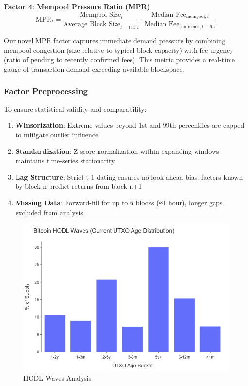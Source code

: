 \documentclass[
  12pt,
  letterpaper,
  DIV=11,
  numbers=noendperiod]{scrartcl}
\providecommand{\tightlist}{%
  \setlength{\itemsep}{0pt}\setlength{\parskip}{0pt}}
\begin{document}
\textbf{Factor 4: Mempool Pressure Ratio (MPR)}
\[\text{MPR}_{t} = \frac{\text{Mempool Size}_t}{\text{Average Block Size}_{t-144:t}} \cdot \frac{\text{Median Fee}_{\text{mempool},t}}{\text{Median Fee}_{\text{confirmed},t-6:t}}\]

Our novel MPR factor captures immediate demand pressure by combining
mempool congestion (size relative to typical block capacity) with fee
urgency (ratio of pending to recently confirmed fees). This metric
provides a real-time gauge of transaction demand exceeding available
blockspace.

\subsubsection{Factor Preprocessing}\label{factor-preprocessing}

To ensure statistical validity and comparability:

\begin{enumerate}
\def\labelenumi{\arabic{enumi}.}
\tightlist
\item
  \textbf{Winsorization}: Extreme values beyond 1st and 99th percentiles
  are capped to mitigate outlier influence
\item
  \textbf{Standardization}: Z-score normalization within expanding
  windows maintains time-series stationarity
\item
  \textbf{Lag Structure}: Strict t-1 dating ensures no look-ahead bias;
  factors known by block n predict returns from block n+1
\item
  \textbf{Missing Data}: Forward-fill for up to 6 blocks (≈1 hour),
  longer gaps excluded from analysis
\end{enumerate}

\begin{figure}[H]

{\centering \includegraphics[width=1\linewidth,height=\textheight,keepaspectratio]{../data/figs/hodl_waves.png}

}

\caption{HODL Waves Analysis}

\end{figure}%
\end{document}
